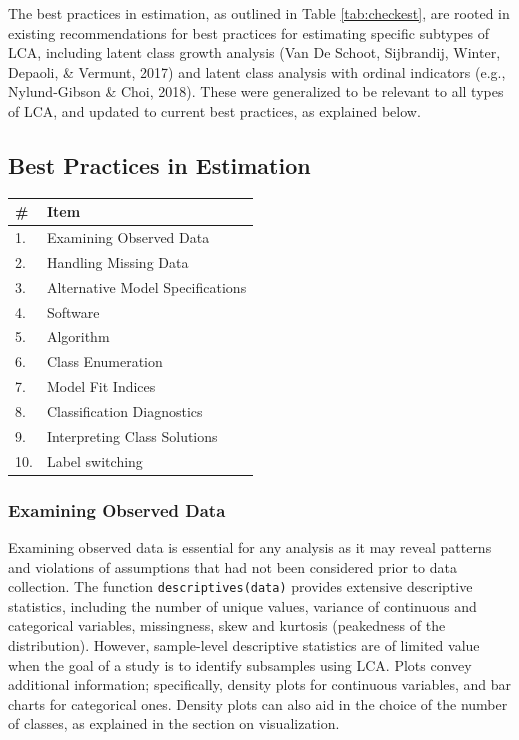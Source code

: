 \documentclass[
  ,man,floatsintext]{apa6}
\begin{document}
The best practices in estimation, as outlined in Table
\ref{tab:checkest}, are rooted in existing recommendations for best
practices for estimating specific subtypes of LCA,
including latent
class growth analysis (Van De Schoot, Sijbrandij, Winter, Depaoli, \& Vermunt, 2017) and latent
class analysis with ordinal indicators (e.g., Nylund-Gibson \& Choi, 2018).
These were generalized to be relevant to all types of LCA, and updated to current best practices, as explained below.

\hypertarget{best-practices-in-estimation}{%
\subsection{Best Practices in Estimation}\label{best-practices-in-estimation}}

\begin{tabular}[t]{l|l}
\hline
\# & Item\\
\hline
1. & Examining Observed Data\\
\hline
2. & Handling Missing Data\\
\hline
3. & Alternative Model Specifications\\
\hline
4. & Software\\
\hline
5. & Algorithm\\
\hline
6. & Class Enumeration\\
\hline
7. & Model Fit Indices\\
\hline
8. & Classification Diagnostics\\
\hline
9. & Interpreting Class Solutions\\
\hline
10. & Label switching\\
\hline
\end{tabular}

\hypertarget{examining-observed-data}{%
\subsubsection{Examining Observed Data}\label{examining-observed-data}}

Examining observed data is essential for any analysis as it may reveal
patterns and violations of assumptions that had not been considered
prior to data collection.
The function \texttt{descriptives(data)} provides extensive descriptive statistics,
including the number of unique values,
variance of continuous and categorical variables,
missingness, skew and kurtosis (peakedness of the distribution).
However, sample-level descriptive statistics are of limited value when the goal of a study is to identify subsamples using LCA.
Plots convey additional information; specifically, density plots for continuous variables, and bar charts
for categorical ones.
Density plots can also aid in the choice of the number of classes, as explained in the section on visualization.
\end{document}
